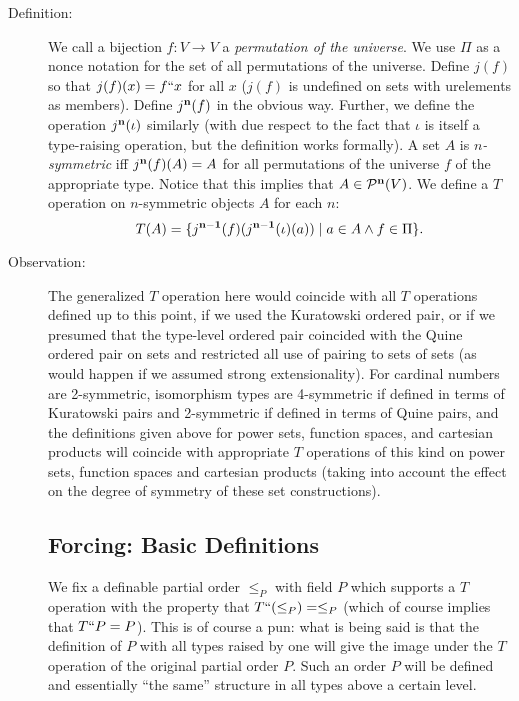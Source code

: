 \documentclass[12pt]{book}
\begin{document}
\begin{description}

\item[Definition:] We call a bijection $f:V \rightarrow V$ a
{\em permutation of the universe\/}.  We use $\Pi$ as a nonce notation for the
set of all permutations of the universe.  Define $j(f)$ so that
$j(f)(x) = f``x$ for all $x$ ($j(f)$ is undefined on sets with
urelements as members).  Define $j^{\bf n}(f)$ in the obvious way.
Further, we define the operation $j^{\bf n}(\iota)$ similarly (with
due respect to the fact that $\iota$ is itself a type-raising
operation, but the definition works formally).  A set $A$ is {\em
$n$-symmetric\/} iff $j^{\bf n}(f)(A) = A$ for all permutations of the
universe $f$ of the appropriate type.  Notice that this implies that
$A \in {\cal P}^{\bf n}(V)$.  We define a $T$ operation on
$n$-symmetric objects $A$ for each $n$: $$T(A) = \{j^{\bf
n-1}(f)(j^{\bf n-1}(\iota)(a)) \mid a \in A \wedge f \in \Pi\}.$$

\item[Observation:] The generalized $T$ operation here would coincide
with all $T$ operations defined up to this point, if we used the
Kuratowski ordered pair, or if we presumed that the type-level ordered
pair coincided with the Quine ordered pair on sets and restricted all
use of pairing to sets of sets (as would happen if we assumed strong
extensionality).  For cardinal numbers are 2-symmetric, isomorphism
types are 4-symmetric if defined in terms of Kuratowski pairs and
2-symmetric if defined in terms of Quine pairs, and the definitions
given above for power sets, function spaces, and cartesian products
will coincide with appropriate $T$ operations of this kind on power
sets, function spaces and cartesian products (taking into account the
effect on the degree of symmetry of these set constructions).

\subsection{Forcing:  Basic Definitions}

We fix a definable partial order $\leq_P$ with field $P$ which
supports a $T$ operation with the property that $T``(\leq_P)=\leq_P$
(which of course implies that $T``P=P$). This is of course a pun: what
is being said is that the definition of $P$ with all types raised by
one will give the image under the $T$ operation of the original
partial order $P$.  Such an order $P$ will be defined and essentially
``the same'' structure in all types above a certain level.


\end{description}
\end{document}

